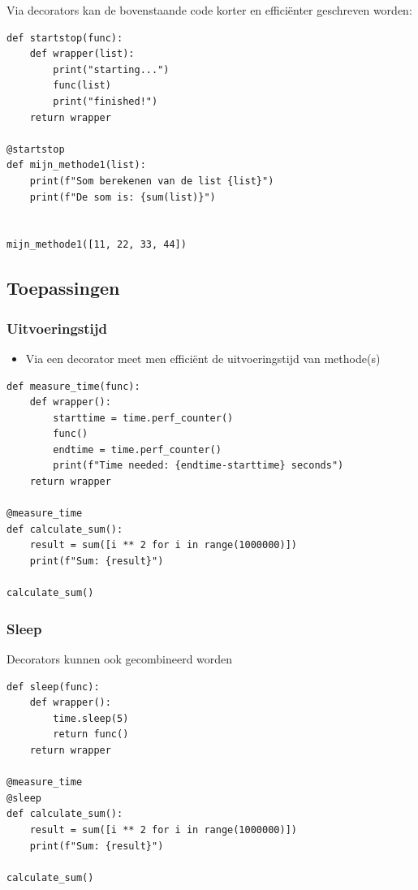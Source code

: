 \documentclass{article}
\begin{document}
Via decorators kan de bovenstaande code korter en efficiënter geschreven worden:

\begin{verbatim}
def startstop(func):
    def wrapper(list):
        print("starting...")
        func(list)
        print("finished!")
    return wrapper

@startstop
def mijn_methode1(list):
    print(f"Som berekenen van de list {list}")
    print(f"De som is: {sum(list)}")


mijn_methode1([11, 22, 33, 44])
\end{verbatim}

\subsection{Toepassingen}


\subsubsection{Uitvoeringstijd}

\begin{itemize}
    \item Via een decorator meet men efficiënt de uitvoeringstijd van methode(s)
\end{itemize}

\begin{verbatim}
def measure_time(func):
    def wrapper():
        starttime = time.perf_counter()
        func()
        endtime = time.perf_counter()
        print(f"Time needed: {endtime-starttime} seconds")
    return wrapper

@measure_time
def calculate_sum():
    result = sum([i ** 2 for i in range(1000000)])
    print(f"Sum: {result}")

calculate_sum()
\end{verbatim}

\subsubsection{Sleep}

Decorators kunnen ook gecombineerd worden

\begin{verbatim}
def sleep(func):
    def wrapper():
        time.sleep(5)
        return func()
    return wrapper

@measure_time
@sleep
def calculate_sum():
    result = sum([i ** 2 for i in range(1000000)])
    print(f"Sum: {result}")

calculate_sum()
\end{verbatim}
\end{document}
